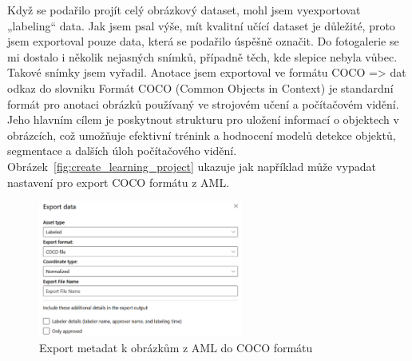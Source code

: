 Když se podařilo projít celý obrázkový dataset, mohl jsem vyexportovat „labeling“ data.
Jak jsem psal výše, mít kvalitní učící dataset je důležité, proto jsem exportoval pouze data, která se podařilo úspěšně označit.
Do fotogalerie se mi dostalo i několik nejasných snímků, případně těch, kde slepice nebyla vůbec.
Takové snímky jsem vyřadil.
Anotace jsem exportoval ve formátu COCO => dat odkaz do slovniku
Formát COCO (Common Objects in Context) je standardní formát pro anotaci obrázků používaný ve strojovém učení a počítačovém vidění.
Jeho hlavním cílem je poskytnout strukturu pro uložení informací o objektech v obrázcích, což umožňuje efektivní trénink a hodnocení modelů detekce objektů, segmentace a dalších úloh počítačového vidění.
Obrázek~\ref{fig:create_learning_project} ukazuje jak například může vypadat nastavení pro export COCO formátu z AML.

\begin{figure}[htbp]
    \centering
    \includegraphics[width=0.6\textwidth]{img/export_coco_format}
    \caption{Export metadat k obrázkům z AML do COCO formátu}
    \label{fig:export_coco_format}
\end{figure}

